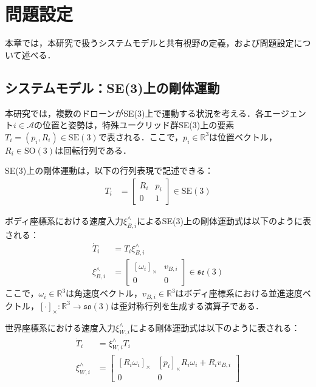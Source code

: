 \section{問題設定}

本章では，本研究で扱うシステムモデルと共有視野の定義，および問題設定について述べる．

\subsection{システムモデル：SE(3)上の剛体運動}

本研究では，複数のドローンがSE(3)上で運動する状況を考える．各エージェント$i \in \mathcal{A}$の位置と姿勢は，特殊ユークリッド群SE(3)上の要素$T_i = (p_i, R_i) \in \mathrm{SE}(3)$で表される．ここで，$p_i \in \mathbb{R}^3$は位置ベクトル，$R_i \in \mathrm{SO}(3)$は回転行列である．

SE(3)上の剛体運動は，以下の行列表現で記述できる：
\begin{equation}
\begin{aligned}
T_i &= \begin{bmatrix}
R_i & p_i \\
0 & 1
\end{bmatrix} \in \mathrm{SE}(3)
\label{eq:se3_matrix}
\end{aligned}
\end{equation}

ボディ座標系における速度入力$\xi^\wedge_{B,i}$によるSE(3)上の剛体運動式は以下のように表される：
\begin{equation}
\begin{aligned}
\dot{T}_i &= T_i \xi^\wedge_{B,i} \\
\xi^\wedge_{B,i} &= \begin{bmatrix}
[\omega_i]_\times & v_{B,i} \\
0 & 0
\end{bmatrix} \in \mathfrak{se}(3)
\label{eq:se3_dynamics_body}
\end{aligned}
\end{equation}
ここで，$\omega_i \in \mathbb{R}^3$は角速度ベクトル，$v_{B,i} \in \mathbb{R}^3$はボディ座標系における並進速度ベクトル，$[\cdot]_\times: \mathbb{R}^3 \rightarrow \mathfrak{so}(3)$は歪対称行列を生成する演算子である．

世界座標系における速度入力$\xi^\wedge_{W,i}$による剛体運動式は以下のように表される：
\begin{equation}
\begin{aligned}
\dot{T}_i &= \xi^\wedge_{W,i} T_i \\
\xi^\wedge_{W,i} &= \begin{bmatrix}
[R_i\omega_i]_\times & [p_i]_\times R_i\omega_i + R_iv_{B,i} \\
0 & 0
\end{bmatrix}
\label{eq:se3_dynamics_world}
\end{aligned}
\end{equation}

